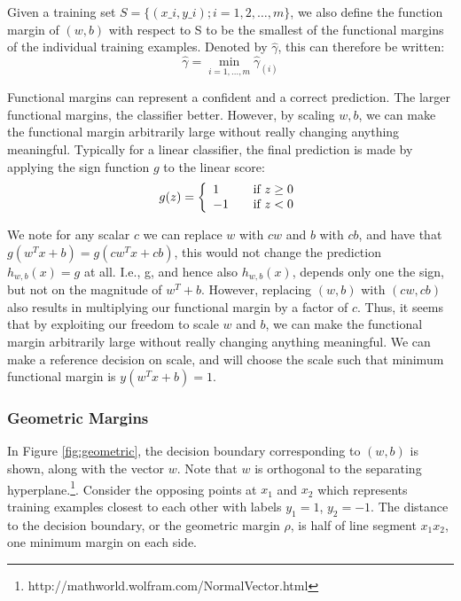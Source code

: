 \documentclass[a4paper]{article}
\begin{document}
Given a training set $S = \{(x\_i, y\_i); i = 1, 2, \dots, m\}$, we also define the function margin of $(w, b)$ with respect to S to be the smallest of the functional margins of the individual training examples. Denoted by $\hat{\gamma}$, this can therefore be written: 
$$
	\hat{\gamma} = \min_{i=1,\dots,m} \hat{\gamma}_{(i)} 
$$

Functional margins can represent a confident and a correct prediction. The larger functional margins, the classifier better. However, by scaling $w, b$, we can make the functional margin arbitrarily large without really changing anything meaningful. Typically for a linear classifier, the final prediction is made by applying the sign function $g$ to the linear score: 
	\[ g(z) = \left\{ 
  		\begin{array}{l l}
    			1 & \quad \text{if $z \geq 0$}\\
 			-1 & \quad \text{if $z < 0 $}
 		 \end{array} \right.\]
		 
We note for any scalar $c$ we can replace $w$ with $cw$ and $b$ with $cb$, and have that $g(w^Tx + b ) = g(cw^Tx + cb)$, this would not change the prediction $h_{w,b}(x) = g$ at all. I.e., g, and hence also $h_{w,b}(x)$, depends only one the sign, but not on the magnitude of $w^T + b$. However, replacing $(w,b)$ with $(cw, cb)$ also results in multiplying our functional margin by a factor of $c$. Thus, it seems that by exploiting our freedom to scale $w$ and $b$, we can make the functional margin arbitrarily large without really changing anything meaningful. We can make a reference decision on scale, and will choose the scale such that minimum functional margin is  $y(w^Tx + b)=1$.

\subsubsection{Geometric Margins}
In Figure \ref{fig:geometric}, the decision boundary corresponding to $(w, b)$ is shown, along with the vector $w$. Note that $w$ is orthogonal to the separating hyperplane.\footnote{http://mathworld.wolfram.com/NormalVector.html}. Consider the opposing points at $x_1$ and $x_2$ which represents training examples closest to each other with labels $y_1 = 1$, $y_2 = -1$. The distance to the decision boundary, or the geometric margin $\rho$, is half of line segment $x_1x_2$, one minimum margin on each side.  
\end{document}
